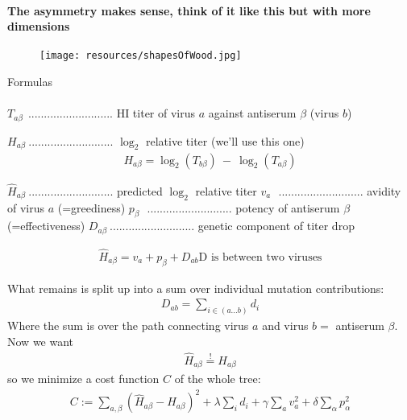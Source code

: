 \documentclass{beamer}
\begin{document}
\begin{darkframes}
    \begin{frame}{\subsecname}
      \framesubtitle{\small The asymmetry makes sense, think of it like this but with more dimensions}
      \begin{figure}
        \texttt{[image: resources/shapesOfWood.jpg]}
        \caption{\footnotesize \cite{rosipaw10}}
      \end{figure}
    \end{frame}

    \begin{frame}[allowframebreaks]{Formulas}
      \framesubtitle{}
      $T_{a\beta}~\ $........................... HI titer of virus $a$ against antiserum $\beta$ (virus $b$)

      $H_{a\beta}~$........................... $\log_2$ relative titer (we'll use this one)
      \begin{align}
        H_{a\beta} = \log_2 (T_{b\beta}) ~ - ~\log_2 ( T_{a\beta})
      \end{align}

      $\hat{H}_{a\beta}~$........................... predicted $\log_2$ relative titer
      $v_{a}~~~$........................... avidity of virus $a$ (=greediness)
      $p_{\beta}~~~$........................... potency of antiserum $\beta$ (=effectiveness)
      $D_{a\beta}~$........................... genetic component of titer drop

      \begin{align}
        \hat{H}_{a\beta} = v_a + p_\beta + D_{ab} \text{D is between two viruses}
      \end{align}


      What remains is split up into a sum over individual mutation contributions:
      \begin{align}
        D_{ab} = \sum_{i \in (a ... b)} d_i
      \end{align}
      Where the sum is over the path connecting virus $a$ and virus $ b \stackrel{}={}$ antiserum $\beta$. Now we want
      \begin{align}
        \hat{H}_{a\beta} \stackrel{!}={} {H}_{a\beta}
      \end{align}
      so we minimize a cost function $C$ of the whole tree:
      \begin{align}
        C := \sum_{a,\beta}( \hat{H}_{a\beta} - {H}_{a\beta})^2 + \lambda \sum_i d_i + \gamma \sum_a v_a^2 + \delta \sum_\alpha p_\alpha^2
      \end{align}


\end{frame}
\end{darkframes}
\end{document}
